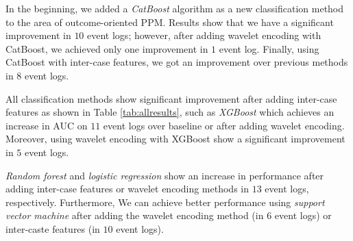 In the beginning, we added a \textit{CatBoost} algorithm as a new classification method to the area of outcome-oriented PPM. Results show that we have a significant improvement in $10$ event logs; however, after adding wavelet encoding with CatBoost, we achieved only one improvement in $1$ event log. Finally, using CatBoost with inter-case features, we got an improvement over previous methods in $8$ event logs.

All classification methods show significant improvement after adding inter-case features as shown in Table \ref{tab:allresults}, such as \textit{XGBoost} which achieves an increase in AUC on $11$ event logs over baseline or after adding wavelet encoding. Moreover, using wavelet encoding with XGBoost show a significant improvement in $5$ event logs. 


\textit{Random forest} and \textit{logistic regression} show an increase in performance after adding inter-case features or wavelet encoding methods in $13$ event logs, respectively. Furthermore, We can achieve better performance using \textit{support vector machine} after adding the wavelet encoding method (in $6$ event logs) or inter-caste features (in $10$ event logs).



